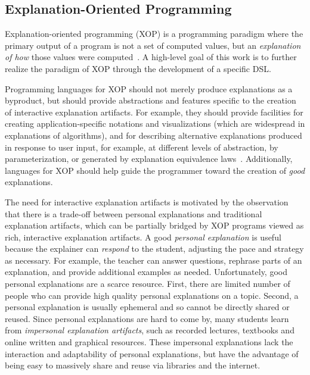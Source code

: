 \documentclass[sigconf]{acmart}
\begin{document}
\subsection{Explanation-Oriented Programming}
\label{sec:back:xop}

Explanation-oriented programming (XOP) is a programming paradigm where the
primary output of a program is not a set of computed values, but an
\emph{explanation of how} those values were
computed~\cite{EW08vl,EW09dsl,EW09vl,WE11dsl,EW13jvlc}.
%
A high-level goal of this work is to further realize the paradigm of XOP
through the development of a specific DSL.


Programming languages for XOP should not merely produce explanations as a
byproduct, but should provide abstractions and features specific to the
creation of interactive explanation artifacts. For example, they should provide
facilities for creating application-specific notations and visualizations
(which are widespread in explanations of algorithms), and for describing
alternative explanations produced in response to user input, for example, at
different levels of abstraction, by parameterization, or generated by
explanation equivalence laws~\cite{EW13jvlc}. Additionally, languages for XOP
should help guide the programmer toward the creation of \emph{good}
explanations.


The need for interactive explanation artifacts is motivated by the observation
that there is a trade-off between personal explanations and traditional
explanation artifacts, which can be partially bridged by XOP programs viewed as
rich, interactive explanation artifacts.
%
A good \emph{personal explanation} is useful because the explainer can
\emph{respond} to the student, adjusting the pace and strategy as necessary.
For example, the teacher can answer questions, rephrase parts of an
explanation, and provide additional examples as needed.
%
Unfortunately, good personal explanations are a scarce resource. First, there
are limited number of people who can provide high quality personal explanations
on a topic. Second, a personal explanation is usually ephemeral and so cannot
be directly shared or reused.
%
Since personal explanations are hard to come by, many students learn from
\emph{impersonal explanation artifacts}, such as recorded lectures, textbooks
and online written and graphical resources.
%
These impersonal explanations lack the interaction and adaptability of personal
explanations, but have the advantage of being easy to massively share and reuse
via libraries and the internet.
\end{document}
